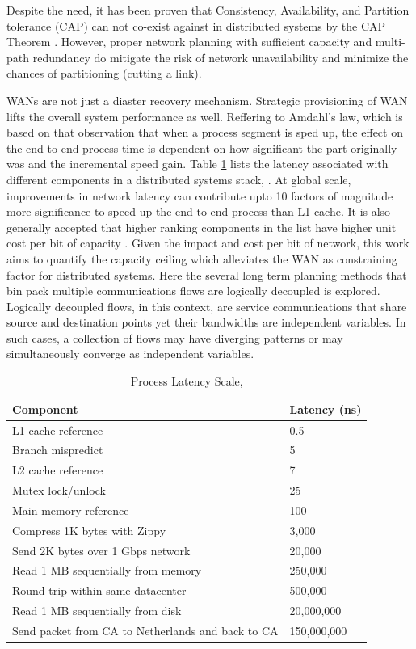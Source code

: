\documentclass[conference]{IEEEtran}
\begin{document}
Despite the need, it has been proven that Consistency, Availability, and Partition tolerance (CAP) can not co-exist against in distributed systems by the CAP Theorem \cite{CAP}. However, proper network planning with sufficient capacity and multi-path redundancy do mitigate the risk of network unavailability and minimize the chances of partitioning (cutting a link).

WANs are not just a diaster recovery mechanism. Strategic provisioning of WAN lifts the overall system performance as well. Reffering to Amdahl's law, which is based on that observation that when a process segment is sped up, the effect on the end to end process time is dependent on how significant the part originally was and the incremental speed gain. Table \ref{dean} lists the latency associated with different components in a distributed systems stack, \cite{Dean}. At global scale, improvements in network latency can contribute upto 10 factors of magnitude more significance to speed up the end to end process than L1 cache. It is also generally accepted that higher ranking components in the list have higher unit cost per bit of capacity \cite{Bryant}. Given the impact and cost per bit of network, this work aims to quantify the capacity ceiling which alleviates the WAN as constraining factor for distributed systems. Here the several long term planning methods that bin pack multiple communications flows are logically decoupled is explored. Logically decoupled flows, in this context, are service communications that share source and destination points yet their bandwidths are independent variables. In such cases, a collection of flows may have diverging patterns or may simultaneously converge as independent variables.
 
\begin{table}[htbp]
\caption{ Process Latency Scale, \cite{Dean}}
\begin{center}
\begin{tabular}{ll}
\hline
\textbf{Component} 					& \textbf{Latency} (ns)	\\
\hline
L1 cache reference					& 0.5					\\
Branch mispredict 					& 5					\\
L2 cache reference					& 7                     \\
Mutex lock/unlock					& 25					\\
Main memory reference				& 100					\\
Compress 1K bytes with Zippy 		& 3,000					\\
Send 2K bytes over 1 Gbps network	& 20,000				\\
Read 1 MB sequentially from memory	& 250,000				\\
Round trip within same datacenter	& 500,000				\\
Read 1 MB sequentially from disk	& 20,000,000			\\
Send packet from CA to Netherlands and back to CA 	& 150,000,000			\\
\hline
\end{tabular}
\label{dean}
\end{center}
\end{table}
\end{document}
